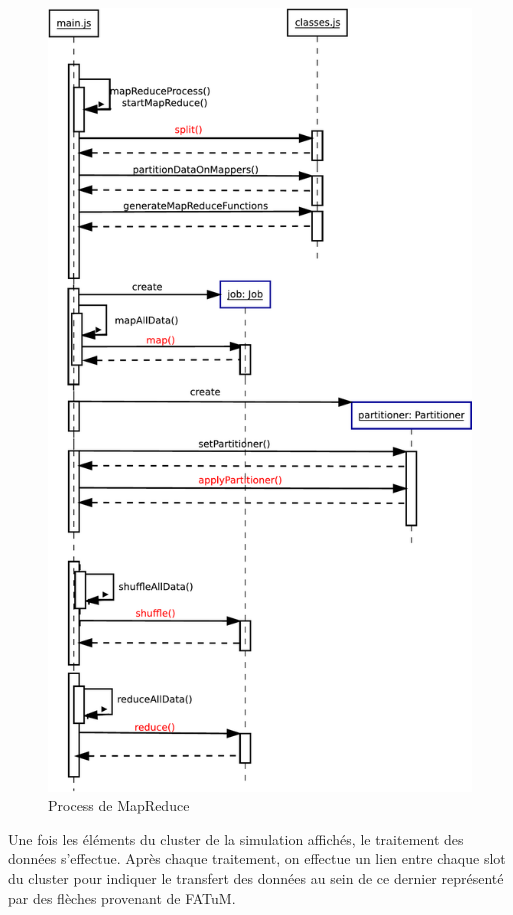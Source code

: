\begin{figure}[H]
  \centering
    \includegraphics[scale=0.6]{diagram/diag_seq_mapReduce.pdf}
        \caption{Process de MapReduce}
\end{figure}

Une fois les éléments du cluster de la simulation affichés, le traitement des données s'effectue. Après chaque traitement, on effectue un lien entre chaque slot du cluster pour indiquer le transfert des données au sein de ce dernier représenté par des flèches provenant de FATuM.

